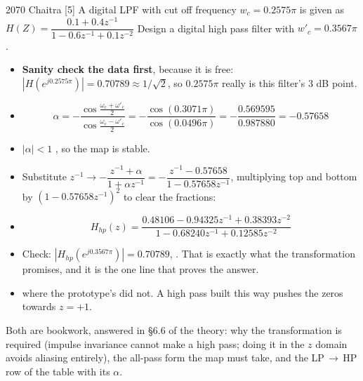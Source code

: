 \begin{asked}{2070 Chaitra \textperiodcentered{} [5]}
A digital LPF with cut off frequency $w_c=0.2575\pi$ is given as
$H(Z)=\dfrac{0.1+0.4z^{-1}}{1-0.6z^{-1}+0.1z^{-2}}$ Design a digital high pass filter
with $w'_c=0.3567\pi$.
\end{asked}

\begin{itemize}
  \item \textbf{Sanity check the data first}, because it is free:
        $|H(e^{j0.2575\pi})|=0.70789\approx1/\sqrt2$, so $0.2575\pi$ really is this
        filter's 3 dB point. 
  \item[] \[ \alpha=-\frac{\cos\frac{\omega_c+\omega'_c}{2}}
                          {\cos\frac{\omega_c-\omega'_c}{2}}
             =-\frac{\cos(0.3071\pi)}{\cos(0.0496\pi)}
             =-\frac{0.569595}{0.987880}=\mathbf{-0.57658} \]
  \item $|\alpha|<1$ \checkmark, so the map is stable.
  \item Substitute $z^{-1}\to-\dfrac{z^{-1}+\alpha}{1+\alpha z^{-1}}
        =-\dfrac{z^{-1}-0.57658}{1-0.57658z^{-1}}$, multiplying top and bottom by
        $(1-0.57658z^{-1})^2$ to clear the fractions:
  \item[] \[ \boxed{\,H_{hp}(z)=\frac{0.48106-0.94325z^{-1}+0.38393z^{-2}}
             {1-0.68240z^{-1}+0.12585z^{-2}}\,} \]
  \item Check: $|H_{hp}(e^{j0.3567\pi})|=\mathbf{0.70789}$, . That is exactly what the transformation promises,
        and it is the one line that proves the answer.
  \item {} where the prototype's did not. A high
        pass built this way pushes the zeros towards $z=+1$.
\end{itemize}

{\color{sub}\footnotesize Both are bookwork, answered in \S6.6 of the theory: why the
transformation is required (impulse invariance cannot make a high pass; doing it in the
$z$ domain avoids aliasing entirely), the all-pass form the map must take, and the
LP\,$\to$\,HP row of the table with its $\alpha$.}
